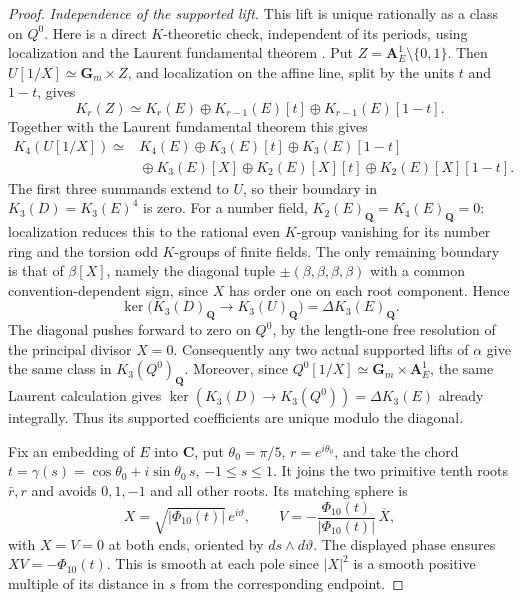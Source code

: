 \documentclass[11pt,a4paper]{article}
\theoremstyle{remark}
\newcommand{\C}{\mathbf C}
\begin{document}
\begin{proof}
\emph{Independence of the supported lift.}
This lift is unique rationally as a class on $Q^0$.
Here is a direct $K$-theoretic check, independent of its periods,
using localization and the Laurent fundamental theorem \cite{Weibel}.
Put $Z=\mathbf A^1_{E}\setminus\{0,1\}$.  Then
$U[1/X]\simeq\mathbf G_m\times Z$, and localization on the
affine line, split by the units $t$ and $1-t$, gives
\[
 K_r(Z)\simeq K_r(E)\oplus
       K_{r-1}(E)[t]\oplus K_{r-1}(E)[1-t].
\]
Together with the Laurent fundamental theorem this gives
\[
\begin{split}
 K_4(U[1/X])\simeq{}&
 K_4(E)\oplus K_3(E)[t]\oplus K_3(E)[1-t]\\
 &{}\oplus K_3(E)[X]
 \oplus K_2(E)[X][t]\oplus K_2(E)[X][1-t].
\end{split}
\]
The first three summands extend to $U$, so their boundary in
$K_3(D)=K_3(E)^4$ is zero.  For a number field,
$K_2(E)_{\mathbf Q}=K_4(E)_{\mathbf Q}=0$: localization
reduces this to the rational even $K$-group vanishing for its
number ring and the torsion odd $K$-groups of finite fields.
The only remaining boundary is that of
$\beta[X]$, namely the diagonal tuple
$\pm(\beta,\beta,\beta,\beta)$ with a common convention-dependent
sign, since $X$ has order one on each root component.  Hence
\[
 \ker\bigl(K_3(D)_{\mathbf Q}\longrightarrow K_3(U)_{\mathbf Q}\bigr)
       =\Delta K_3(E)_{\mathbf Q}.
\]
The diagonal pushes forward to zero on $Q^0$, by the
length-one free resolution of the principal divisor $X=0$.
Consequently any two actual supported lifts of $\alpha$ give
the same class in $K_3(Q^0)_{\mathbf Q}$.
Moreover, since
$Q^0[1/X]\simeq\mathbf G_m\times\mathbf A^1_{E}$, the same
Laurent calculation gives
$\ker(K_3(D)\to K_3(Q^0))=\Delta K_3(E)$ already integrally.
Thus its supported coefficients are unique modulo the diagonal.

Fix an embedding of $E$ into $\C$, put $\theta_0=\pi/5$,
$r=e^{i\theta_0}$, and take the chord
$t=\gamma(s)=\cos\theta_0+i\sin\theta_0\,s$, $-1\le s\le1$.
It joins the two primitive tenth roots $\bar r,r$ and avoids
$0,1,-1$ and all other roots. Its matching sphere is
\[
 X=\sqrt{|\Phi_{10}(t)|}\,e^{i\vartheta},\qquad
 V=-\frac{\Phi_{10}(t)}{|\Phi_{10}(t)|}\,\overline X,
\]
with $X=V=0$ at both ends, oriented by $ds\wedge d\vartheta$.
The displayed phase ensures $XV=-\Phi_{10}(t)$. This is smooth
at each pole since $|X|^2$ is a smooth positive multiple of its
distance in $s$ from the corresponding endpoint.


\end{proof}
\end{document}

